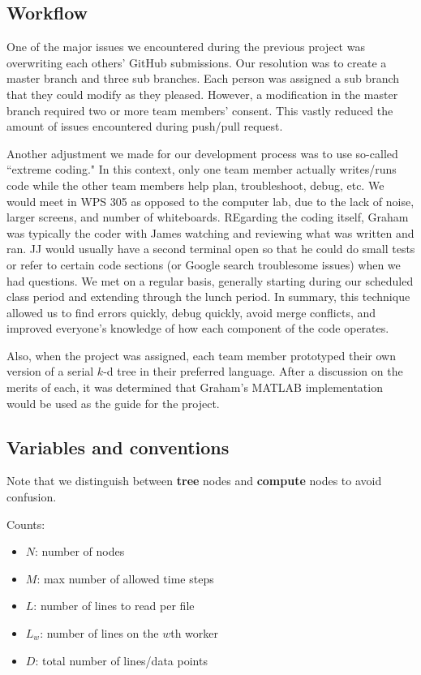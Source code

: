 \documentclass{article}
\begin{document}
\subsection{Workflow}
One of the major issues we encountered during the previous project was overwriting each others' GitHub submissions. Our resolution was to create a master branch and three sub branches. Each person was assigned a sub branch that they could modify as they pleased. However, a modification in the master branch required two or more team members' consent. This vastly reduced the amount of issues encountered during push/pull request.

Another adjustment we made for our development process was to use so-called ``extreme coding." In this context, only one team member actually writes/runs code while the other team members help plan, troubleshoot, debug, etc. We would meet in WPS 305 as opposed to the computer lab, due to the lack of noise, larger screens, and number of whiteboards. REgarding the coding itself, Graham was typically the coder with James watching and reviewing what was written and ran. JJ would usually have a second terminal open so that he could do small tests or refer to certain code sections (or Google search troublesome issues) when we had questions. We met on a regular basis, generally starting during our scheduled class period and extending through the lunch period. In summary, this technique allowed us to find errors quickly, debug quickly, avoid merge conflicts, and improved everyone's knowledge of how each component of the code operates.

Also, when the project was assigned, each team member prototyped their own version of a serial $k$-d tree in their preferred language. After a discussion on the merits of each, it was determined that Graham’s MATLAB implementation would be used as the guide for the project. 


\subsection{Variables and conventions}
Note that we distinguish between \textbf{tree} nodes and \textbf{compute} nodes to avoid confusion.

\begin{mdframed}[backgroundcolor=blue!20]
	Counts:
	\setlength\itemsep{0.1pt}
	\setlength\parskip{0.1pt}
	\begin{itemize}
		\setlength\itemsep{0.1pt}
		\setlength\parskip{0.1pt}
		\item $N$: number of nodes
		\item $M$: max number of allowed time steps
		\item $L$: number of lines to read per file
		\item $L_w$: number of lines on the $w$th worker
		\item $D$: total number of lines/data points
	\end{itemize}
\end{mdframed}
\end{document}
